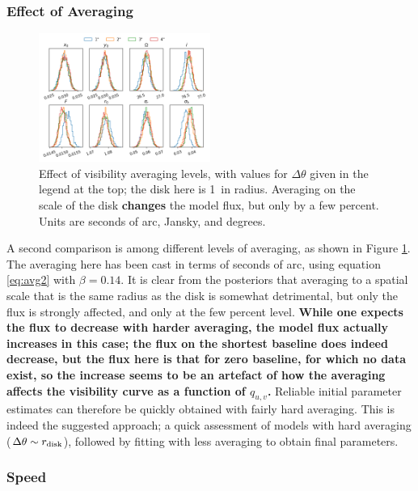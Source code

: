 \documentclass[fleqn,usenatbib]{mnras}
\begin{document}
\subsubsection{Effect of Averaging}

\begin{figure}
    \centering
    \includegraphics[width=0.5\textwidth]{avg.png}
    \caption{Effect of visibility averaging levels, with values for $\Delta \theta$ given in the legend at the top; the disk here is 1\arcsec~in radius. Averaging on the scale of the disk \textbf{changes} the model flux, but only by a few percent. Units are seconds of arc, Jansky, and degrees.}
    \label{fig:avg}
\end{figure}

A second comparison is among different levels of averaging, as shown in Figure \ref{fig:avg}. The averaging here has been cast in terms of seconds of arc, using equation \ref{eq:avg2} with $\beta=0.14$. It is clear from the posteriors that averaging to a spatial scale that is the same radius as the disk is somewhat detrimental, but only the flux is strongly affected, and only at the few percent level. \textbf{While one expects the flux to decrease with harder averaging, the model flux actually increases in this case; the flux on the shortest baseline does indeed decrease, but the flux here is that for zero baseline, for which no data exist, so the increase seems to be an artefact of how the averaging affects the visibility curve as a function of $q_{u,v}$.} Reliable initial parameter estimates can therefore be quickly obtained with fairly hard averaging. This is indeed the suggested approach; a quick assessment of models with hard averaging ($\Delta \theta \sim r_{\rm disk}$), followed by fitting with less averaging to obtain final parameters.

\subsubsection{Speed}
\end{document}

